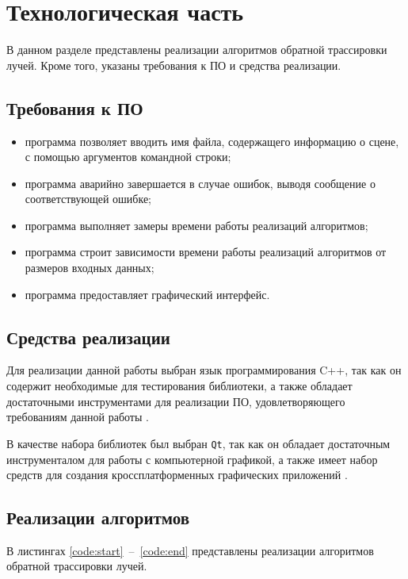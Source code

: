 \chapter{Технологическая часть}

В данном разделе представлены реализации алгоритмов обратной трассировки лучей. Кроме того, указаны требования к ПО и средства реализации.

\section{Требования к ПО}
\begin{itemize}
	\item программа позволяет вводить имя файла, содержащего информацию о сцене, с помощью аргументов командной строки;
	\item программа аварийно завершается в случае ошибок, выводя сообщение о соответствующей ошибке;
	\item программа выполняет замеры времени работы реализаций алгоритмов;
	\item программа строит зависимости времени работы реализаций алгоритмов от размеров входных данных;
	\item программа предоставляет графический интерфейс.
\end{itemize}

\section{Средства реализации}
Для реализации данной работы выбран язык программирования C++, так как он содержит необходимые для тестирования библиотеки, а также обладает достаточными инструментами для реализации ПО, удовлетворяющего требованиям данной работы \cite{bib:3}.

В качестве набора библиотек был выбран \texttt{Qt}, так как он обладает достаточным инструменталом для работы с компьютерной графикой, а также имеет набор средств для создания кроссплатформенных графических приложений \cite{bib:qt}.

\section{Реализации алгоритмов}
В листингах \ref{code:start}~--~\ref{code:end} представлены реализации алгоритмов обратной трассировки лучей.

\newpage

